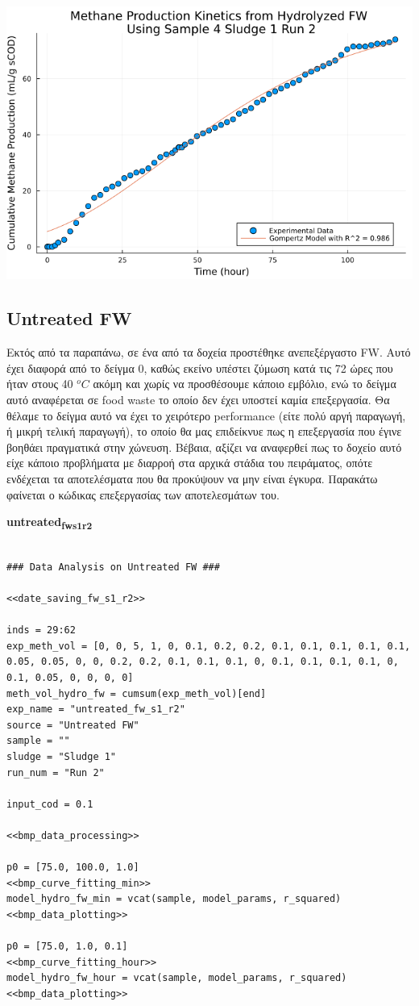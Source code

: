 \documentclass[11pt]{article}
\begin{document}
\begin{center}
\includegraphics[width=.9\linewidth]{../plots/BMPs/Hydrolyzed FW/methane_kinetics_hydrolysate_4_s1_r2_hour.png}
\end{center}

\subsection{Untreated FW}
\label{sec:org497eacc}
Εκτός από τα παραπάνω, σε ένα από τα δοχεία προστέθηκε ανεπεξέργαστο FW. Αυτό έχει διαφορά από το δείγμα 0, καθώς εκείνο υπέστει ζύμωση κατά τις 72 ώρες που ήταν στους 40 \(^oC\) ακόμη και χωρίς να προσθέσουμε κάποιο εμβόλιο, ενώ το δείγμα αυτό αναφέρεται σε food waste το οποίο δεν έχει υποστεί καμία επεξεργασία. Θα θέλαμε το δείγμα αυτό να έχει το χειρότερο performance (είτε πολύ αργή παραγωγή, ή μικρή τελική παραγωγή), το οποίο θα μας επιδείκνυε πως η επεξεργασία που έγινε βοηθάει πραγματικά στην χώνευση. Βέβαια, αξίζει να αναφερθεί πως το δοχείο αυτό είχε κάποιο προβλήματα με διαρροή στα αρχικά στάδια του πειράματος, οπότε ενδέχεται τα αποτελέσματα που θα προκύψουν να μην είναι έγκυρα. Παρακάτω φαίνεται ο κώδικας επεξεργασίας των αποτελεσμάτων του.

\textbf{untreated\textsubscript{fw}\textsubscript{s1}\textsubscript{r2}}
\begin{verbatim}

### Data Analysis on Untreated FW ###

<<date_saving_fw_s1_r2>>

inds = 29:62
exp_meth_vol = [0, 0, 5, 1, 0, 0.1, 0.2, 0.2, 0.1, 0.1, 0.1, 0.1, 0.1, 0.05, 0.05, 0, 0, 0.2, 0.2, 0.1, 0.1, 0.1, 0, 0.1, 0.1, 0.1, 0.1, 0, 0.1, 0.05, 0, 0, 0, 0]
meth_vol_hydro_fw = cumsum(exp_meth_vol)[end]
exp_name = "untreated_fw_s1_r2"
source = "Untreated FW"
sample = ""
sludge = "Sludge 1"
run_num = "Run 2"

input_cod = 0.1

<<bmp_data_processing>>

p0 = [75.0, 100.0, 1.0]
<<bmp_curve_fitting_min>>
model_hydro_fw_min = vcat(sample, model_params, r_squared)
<<bmp_data_plotting>>

p0 = [75.0, 1.0, 0.1]
<<bmp_curve_fitting_hour>>
model_hydro_fw_hour = vcat(sample, model_params, r_squared)
<<bmp_data_plotting>>
\end{verbatim}
\end{document}
